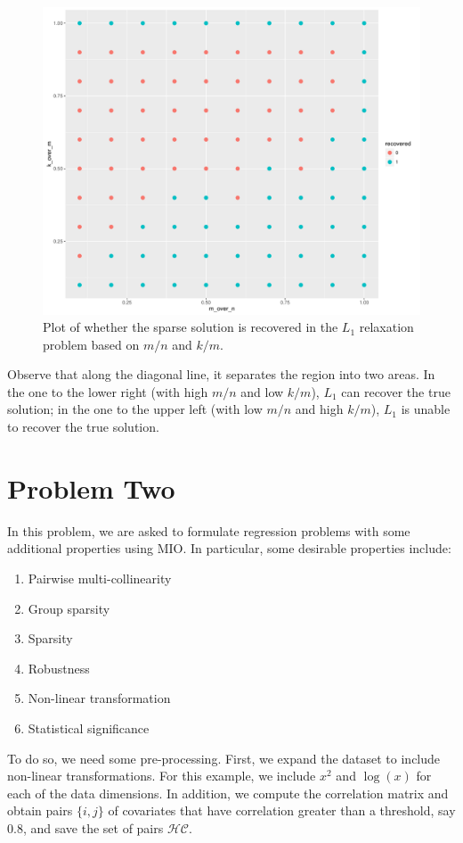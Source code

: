 \documentclass[12pt]{article}
\newcommand{\1}{\mathds{1}}
\begin{document}
\begin{figure}
\includegraphics[scale=0.6]{hw1_output.pdf}
\caption{Plot of whether the sparse solution is recovered in the $L_1$ relaxation problem based on $m/n$ and $k/m$. }\label{fig:prob1}
\end{figure}

Observe that along the diagonal line, it separates the region into two areas. In the one to the lower right (with high $m/n$ and low $k/m$), $L_1$ can recover the true solution; in the one to the upper left (with low $m/n$ and high $k/m$), $L_1$ is unable to recover the true solution.


\newpage
\section{Problem Two}
In this problem, we are asked to formulate regression problems with some additional properties using MIO. In particular, some desirable properties include:
\begin{enumerate}
\item Pairwise multi-collinearity
\item Group sparsity
\item Sparsity
\item Robustness
\item Non-linear transformation
\item Statistical significance
\end{enumerate}

To do so, we need some pre-processing. First, we expand the dataset to include non-linear transformations. For this example, we include $x^2$ and $\log(x)$ for each of the data dimensions.  In addition, we compute the correlation matrix and obtain pairs $\{i,j\}$ of covariates that have correlation greater than a threshold, say $0.8$, and save the set of pairs $\mathcal{HC}$. 
\end{document}
